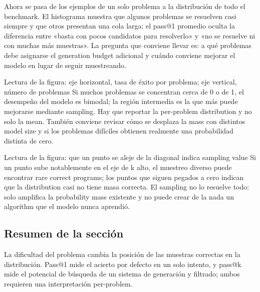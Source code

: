 Ahora se pasa de los ejemplos de un solo problema a la distribución de todo el benchmark. El histograma muestra que algunos problemas se resuelven casi siempre y que otros presentan una cola larga; el pass@1 promedio oculta la diferencia entre «basta con pocos candidatos para resolverlo» y «no se resuelve ni con muchas más muestras». La pregunta que conviene llevar es: a qué problemas debe asignarse el generation budget adicional y cuándo conviene mejorar el modelo en lugar de seguir muestreando.


\begin{knowledgebox}{Lectura de la figura: eje horizontal, tasa de éxito por problema; eje vertical, número de problemas}
Si muchos problemas se concentran cerca de 0 o de 1, el desempeño del modelo es bimodal; la región intermedia es la que más puede mejorarse mediante sampling. Hay que reportar la per-problem distribution y no solo la mean. También conviene revisar cómo se desplaza la mass con distintos model size y si los problemas difíciles obtienen realmente una probabilidad distinta de cero.
\end{knowledgebox}


\begin{knowledgebox}{Lectura de la figura: que un punto se aleje de la diagonal indica sampling value}
Si un punto sube notablemente en el eje de k alto, el muestreo diverso puede encontrar rare correct programs; los puntos que siguen pegados a cero indican que la distribution casi no tiene masa correcta. El sampling no lo resuelve todo: solo amplifica la probability mass existente y no puede crear de la nada un algorithm que el modelo nunca aprendió.
\end{knowledgebox}

\subsection{Resumen de la sección}

La dificultad del problema cambia la posición de las muestras correctas en la distribución. Pass@1 mide el acierto por defecto en un solo intento, y pass@k mide el potencial de búsqueda de un sistema de generación y filtrado; ambos requieren una interpretación per-problem.
